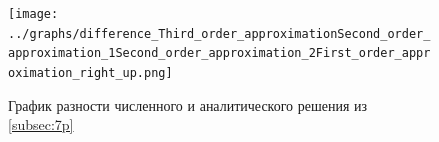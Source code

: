 \documentclass[a4paper, 12pt]{article} %
\begin{document}
\begin{figure}[h!]
    \centering
    \texttt{[image: ../graphs/difference\_Third\_order\_approximationSecond\_order\_approximation\_1Second\_order\_approximation\_2First\_order\_approximation\_right\_up.png]}
    \caption{График разности численного и аналитического решения из \ref{subsec:7p} \\ }
    \label{fig:vac}
\end{figure}
\end{document}
